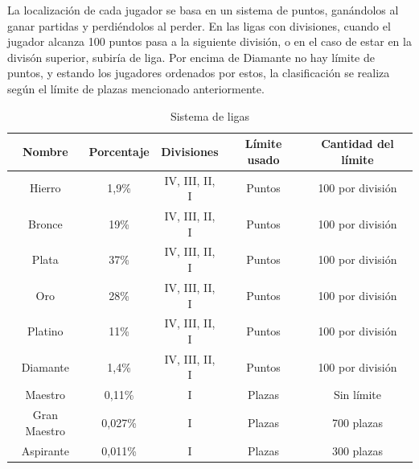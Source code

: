 La localización de cada jugador se basa en un sistema de puntos, ganándolos al ganar partidas y perdiéndolos al perder. En las ligas con divisiones, cuando el jugador alcanza 100 puntos pasa a la siguiente división, o en el caso de estar en la divisón superior, subiría de liga. Por encima de Diamante no hay límite de puntos, y estando los jugadores ordenados por estos, la clasificación se realiza según el límite de plazas mencionado anteriormente.

\begin{table}[h]
	\begin{tabular}{c|c|c|c|c}
		\textbf{Nombre} & \textbf{Porcentaje} & \textbf{Divisiones} & \textbf{Límite usado} & \textbf{Cantidad del límite} \\ \hline \hline
		Hierro & 1,9\% & IV, III, II, I & Puntos  & 100 por división \\ \hline
		Bronce & 19\% & IV, III, II, I & Puntos  & 100 por división \\ \hline
		Plata & 37\% & IV, III, II, I & Puntos  & 100 por división \\ \hline
		Oro & 28\% & IV, III, II, I & Puntos  & 100 por división \\ \hline
		Platino & 11\% & IV, III, II, I & Puntos  & 100 por división \\ \hline
		Diamante & 1,4\% & IV, III, II, I & Puntos  & 100 por división \\ \hline
		Maestro & 0,11\% & I & Plazas  & Sin límite \\ \hline
		Gran Maestro & 0,027\% & I & Plazas  & 700 plazas \\ \hline
		Aspirante & 0,011\% & I & Plazas  & 300 plazas \\
	\end{tabular}
	\caption{Sistema de ligas}
	\label{tab:ligas}
\end{table}
 

